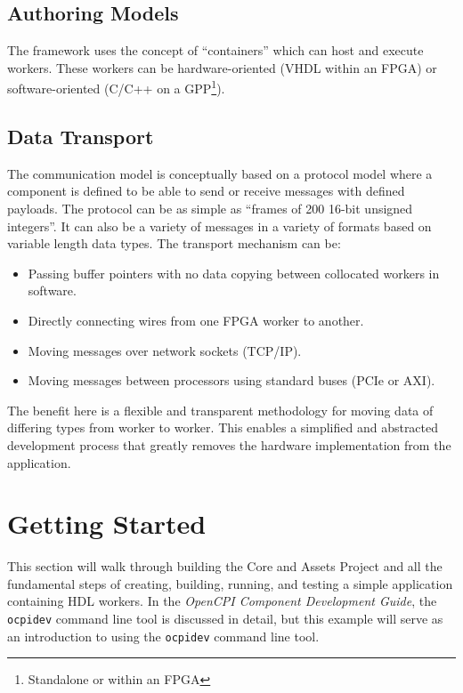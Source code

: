\subsection{Authoring Models}
\label{subsec:Authoring_Models}
The framework uses the concept of ``containers'' which can host and execute workers. These workers can be hardware-oriented (VHDL within an FPGA) or software-oriented (C/C++ on a GPP\footnote{Standalone or within an FPGA}).

\subsection{Data Transport}
\label{subsec:Data_Transport}
The communication model is conceptually based on a protocol model where a component is defined to be able to send or receive messages
with defined payloads. The protocol can be as simple as ``frames of 200 16-bit unsigned integers''. It can also be a variety of messages in a variety of formats based on variable length data types. The transport mechanism can be:
\begin{itemize}
\item Passing buffer pointers with no data copying between collocated workers in software.
\item Directly connecting wires from one FPGA worker to another.
\item Moving messages over network sockets (TCP/IP).
\item Moving messages between processors using standard buses (PCIe or AXI).
\end{itemize}

The benefit here is a flexible and transparent methodology for moving data of differing types from worker to worker. This enables a simplified and abstracted development process that greatly removes the hardware implementation from the application.

\newpage
\section{Getting Started}
This section will walk through building the Core and Assets Project and all the fundamental steps of creating, building, running, and testing a simple application containing HDL workers. In the \textit{OpenCPI Component Development Guide}, the \verb+ocpidev+ command line tool is discussed in detail, but this example will serve as an introduction to using the \verb+ocpidev+ command line tool.

